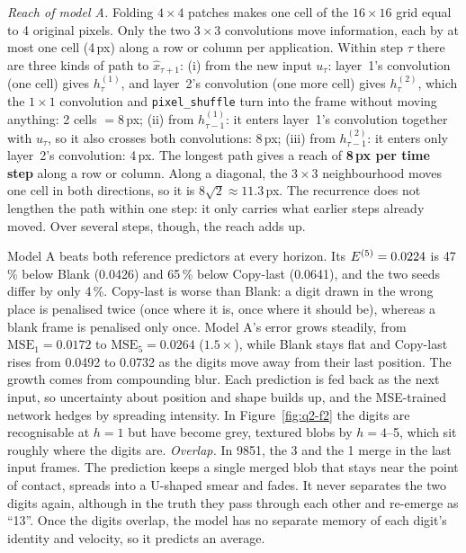  \emph{Reach of model A.} Folding $4\times4$ patches makes one cell of the $16\times16$ grid
equal to 4 original pixels. Only the two $3\times3$ convolutions move information, each by at most one
cell (4\,px) along a row or column per application. Within step $\tau$ there are three kinds of path to
$\hat x_{\tau+1}$:
(i) from the new input $u_\tau$: layer~1's convolution (one cell) gives $h^{(1)}_\tau$, and layer~2's
convolution (one more cell) gives $h^{(2)}_\tau$, which the $1\times1$ convolution and \texttt{pixel\_shuffle}
turn into the frame without moving anything: 2 cells $=8$\,px;
(ii) from $h^{(1)}_{\tau-1}$: it enters layer~1's convolution together with $u_\tau$, so it also crosses
both convolutions: 8\,px;
(iii) from $h^{(2)}_{\tau-1}$: it enters only layer~2's convolution: 4\,px.
The longest path gives a reach of \textbf{8\,px per time step} along a row or column. Along a diagonal,
the $3\times3$ neighbourhood moves one cell in both directions, so it is $8\sqrt2\approx11.3$\,px.
The recurrence does not lengthen the path within one step: it only carries what earlier steps already
moved. Over several steps, though, the reach adds up.

 Model A beats both reference predictors at every horizon. Its $E^{(5)}=0.0224$ is 47\,\% below
Blank (0.0426) and 65\,\% below Copy-last (0.0641), and the two seeds differ by only 4\,\%. Copy-last is
worse than Blank: a digit drawn in the wrong place is penalised twice (once where it is, once where it
should be), whereas a blank frame is penalised only once. Model A's error grows steadily, from
$\mathrm{MSE}_1=0.0172$ to $\mathrm{MSE}_5=0.0264$ ($1.5\times$), while Blank stays flat and Copy-last
rises from 0.0492 to 0.0732 as the digits move away from their last position. The growth comes from
compounding blur. Each prediction is fed back as the next input, so uncertainty about position and
shape builds up, and the MSE-trained network hedges by spreading intensity. In Figure~\ref{fig:q2-f2}
the digits are recognisable at $h=1$ but have become grey, textured blobs by $h=4$--5, which sit roughly
where the digits are.
\emph{Overlap.} In 9851, the 3 and the 1 merge in the last input frames. The prediction keeps a single
merged blob that stays near the point of contact, spreads into a U-shaped smear and fades. It never
separates the two digits again, although in the truth they pass through each other and re-emerge as
``13''. Once the digits overlap, the model has no separate memory of each digit's identity and velocity,
so it predicts an average.

